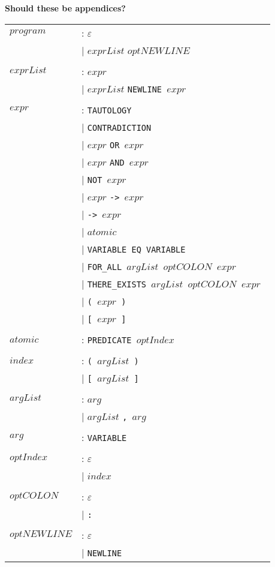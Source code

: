 		\textbf{Should these be appendices?}

		\begin{tabular}{ll}
		$program$ & :    $\varepsilon$ \\
		{} & $\mid$      $exprList$ $optNEWLINE$ \\
		\\

		$exprList$ & :   $expr$ \\
		{} & $\mid$      $exprList$ \tt{NEWLINE} $expr$ \\
		\\

		$expr$ & :       \tt{TAUTOLOGY} \\
		{} & $\mid$      \tt{CONTRADICTION} \\
		{} & $\mid$      $expr$ \tt{OR} $expr$ \\
		{} & $\mid$      $expr$ \tt{AND} $expr$ \\
		{} & $\mid$      \tt{NOT} $expr$ \\
		{} & $\mid$      $expr$ \tt{->} $expr$ \\
		{} & $\mid$      \tt{->} $expr$ \\
		{} & $\mid$      $atomic$ \\
		{} & $\mid$      \tt{VARIABLE EQ VARIABLE} \\
		{} & $\mid$      \tt{FOR\_ALL} $argList$ $optCOLON$ $expr$ \\
		{} & $\mid$      \tt{THERE\_EXISTS} $argList$ $optCOLON$ $expr$ \\
		{} & $\mid$      \tt{(} $expr$ \tt{)} \\
		{} & $\mid$      \tt{[} $expr$ \tt{]} \\
		\\

		$atomic$ & :     \tt{PREDICATE} $optIndex$ \\
		\\

		$index$ & :      \tt{(} $argList$ \tt{)} \\
		{} & $\mid$      \tt{[} $argList$ \tt{]} \\
		\\

		$argList$ & :    $arg$ \\
		{} & $\mid$      $argList$ \tt{,} $arg$ \\
		\\

		$arg$ & :        \tt{VARIABLE} \\
		\\

		$optIndex$ & :   $\varepsilon$ \\
		{} & $\mid$      $index$ \\
		\\

		$optCOLON$ & :   $\varepsilon$ \\
		{} & $\mid$      \tt{:} \\
		\\

		$optNEWLINE$ & : $\varepsilon$ \\
		{} & $\mid$      \tt{NEWLINE} \\
		\end{tabular}

